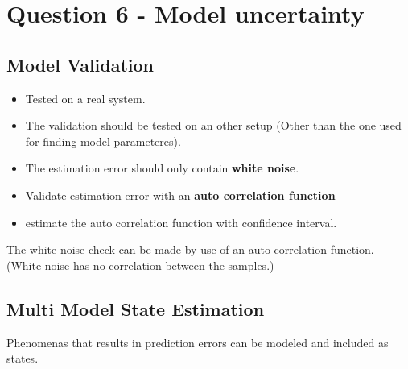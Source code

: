 \chapter{Question 6 - Model uncertainty}

\section*{Model Validation}
\begin{itemize}
         \item Tested on a real system.
         \item The validation should be tested on an other setup (Other than the one used for finding model parameteres).
         \item The estimation error should only contain \textbf{white noise}.
         \item Validate estimation error with an \textbf{auto correlation function}
         \item estimate the auto correlation function with confidence interval.
 \end{itemize} 


The white noise check can be made by use of an auto correlation function. (White noise has no correlation between the samples.)


\section*{Multi Model State Estimation}
Phenomenas that results in prediction errors can be modeled and included as states. 

